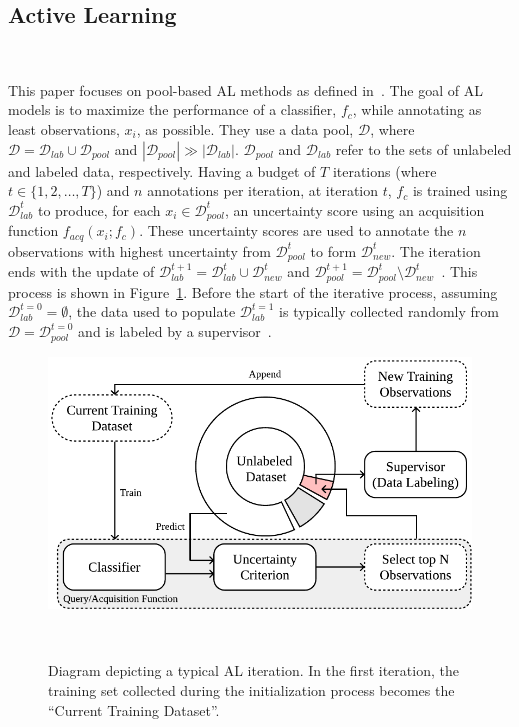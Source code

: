 \subsection{Active Learning}~\label{sec:active_learning_methods-al-aug}

This paper focuses on pool-based AL methods as defined
in~\cite{katz2021improved}. The goal of AL models is to maximize the
performance of a classifier, $f_{c}$, while annotating as least observations,
$x_i$, as possible. They use a data pool, $\mathcal{D}$, where $\mathcal{D} =
\mathcal{D}_{lab} \cup \mathcal{D}_{pool}$ and $|\mathcal{D}_{pool}| \gg
|\mathcal{D}_{lab}|$. $\mathcal{D}_{pool}$ and $\mathcal{D}_{lab}$ refer to
the sets of unlabeled and labeled data, respectively. Having a budget of $T$
iterations (where $t \in \{1, 2, \ldots, T\}$) and $n$ annotations per iteration, at
iteration $t$, $f_c$ is trained using $\mathcal{D}_{lab}^t$ to produce, for
each $x_i \in \mathcal{D}_{pool}^t$, an uncertainty score using an acquisition
function $f_{acq}(x_i;f_c)$. These uncertainty scores are used to annotate the
$n$ observations with highest uncertainty from $\mathcal{D}_{pool}^t$ to form
$\mathcal{D}_{new}^t$. The iteration ends with the update of
$\mathcal{D}_{lab}^{t+1} = \mathcal{D}_{lab}^t \cup \mathcal{D}_{new}^t$ and
$\mathcal{D}_{pool}^{t+1} = \mathcal{D}_{pool}^t \setminus
\mathcal{D}_{new}^t$~\cite{Su2020, Sverchkov2017}. This process is shown in
Figure~\ref{fig:al_iteration}. Before the start of the iterative process,
assuming $\mathcal{D}_{lab}^{t=0} = \emptyset$, the data used to populate
$\mathcal{D}_{lab}^{t=1}$ is typically collected randomly from $\mathcal{D} =
\mathcal{D}_{pool}^{t=0}$ and is labeled by a supervisor~\cite{Fonseca2021al,
Yoo2019, Aghdam2019}. 

\begin{figure}[ht]
	\centering
	\includegraphics[width=.6\linewidth]{al_iteration}
    \caption[Diagram depicting a typical AL iteration.]{%
        Diagram depicting a typical AL iteration. In the first iteration, the
        training set collected during the initialization process becomes the
        ``Current Training Dataset''.
    }~\label{fig:al_iteration}
\end{figure}

